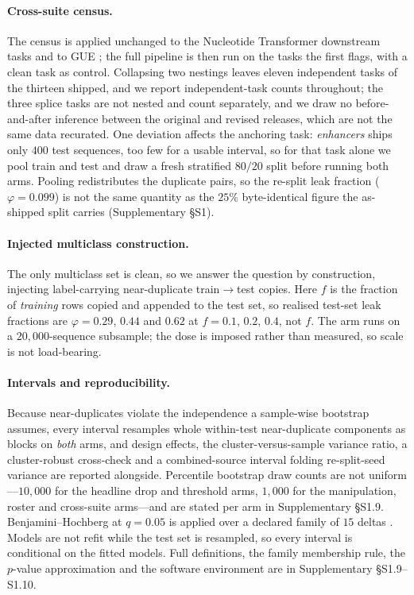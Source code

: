 \documentclass[webpdf,modern,large,namedate]{oup-authoring-template}%
\begin{document}
\paragraph{Cross-suite census.} The census is applied unchanged to the Nucleotide Transformer downstream tasks \citep{dallatorre2024nucleotide} and to GUE \citep{zhou2023dnabert2}; the full pipeline is then run on the tasks the first flags, with a clean task as control. Collapsing two nestings leaves eleven independent tasks of the thirteen shipped, and we report independent-task counts throughout; the three splice tasks are not nested and count separately, and we draw no before-and-after inference between the original and revised releases, which are not the same data recurated. One deviation affects the anchoring task: \textit{enhancers} ships only $400$ test sequences, too few for a usable interval, so for that task alone we pool train and test and draw a fresh stratified $80/20$ split before running both arms. Pooling redistributes the duplicate pairs, so the re-split leak fraction ($\varphi=0.099$) is not the same quantity as the $25\%$ byte-identical figure the as-shipped split carries (Supplementary \S S1).

\paragraph{Injected multiclass construction.} The only multiclass set is clean, so we answer the question by construction, injecting label-carrying near-duplicate train$\to$test copies. Here $f$ is the fraction of \emph{training} rows copied and appended to the test set, so realised test-set leak fractions are $\varphi=0.29$, $0.44$ and $0.62$ at $f=0.1$, $0.2$, $0.4$, not $f$. The arm runs on a $20{,}000$-sequence subsample; the dose is imposed rather than measured, so scale is not load-bearing.

\paragraph{Intervals and reproducibility.} Because near-duplicates violate the
independence a sample-wise bootstrap assumes, every interval resamples whole within-test
near-duplicate components as blocks on \emph{both} arms, and design effects, the cluster-versus-sample
variance ratio, a cluster-robust cross-check and a combined-source interval folding re-split-seed
variance are reported alongside. Percentile bootstrap draw counts are not uniform---$10{,}000$ for the headline drop and
threshold arms, $1{,}000$ for the manipulation, roster and cross-suite arms---and are stated
per arm in Supplementary \S S1.9. Benjamini--Hochberg at $q=0.05$ is applied over a declared
family of $15$ deltas \citep{benjamini1995fdr}. Models are not refit while the test set is resampled, so every
interval is conditional on the fitted models. Full definitions, the family membership rule, the
$p$-value approximation and the software environment are in Supplementary \S S1.9--S1.10.
\end{document}
